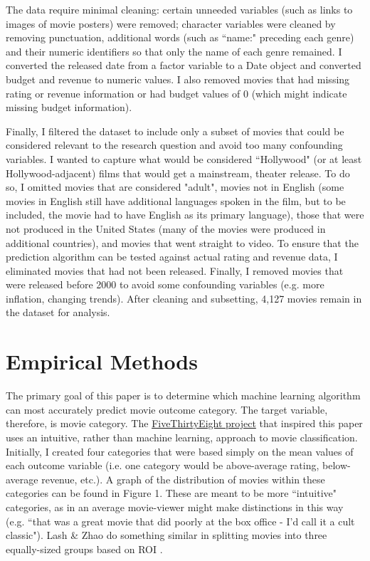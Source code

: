 \documentclass[12pt,english]{article}
\begin{document}
The data require minimal cleaning: certain unneeded variables (such as links to images of movie posters) were removed; character variables were cleaned by removing punctuation, additional words (such as ``name:" preceding each genre) and their numeric identifiers so that only the name of each genre remained. I converted the released date from a factor variable to a Date object and converted budget and revenue to numeric values. I also removed movies that had missing rating or revenue information or had budget values of 0 (which might indicate missing budget information).

Finally, I filtered the dataset to include only a subset of movies that could be considered relevant to the research question and avoid too many confounding variables. I wanted to capture what would be considered ``Hollywood" (or at least Hollywood-adjacent) films that would get a mainstream, theater release. To do so, I omitted movies that are considered "adult", movies not in English (some movies in English still have additional languages spoken in the film, but to be included, the movie had to have English as its primary language), those that were not produced in the United States (many of the movies were produced in additional countries), and movies that went straight to video. To ensure that the prediction algorithm can be tested against actual rating and revenue data, I eliminated movies that had not been released. Finally, I removed movies that were released before 2000 to avoid some confounding variables (e.g. more inflation, changing trends). After cleaning and subsetting, 4,127 movies remain in the dataset for analysis.

\section{Empirical Methods}
The primary goal of this paper is to determine which machine learning algorithm can most accurately predict movie outcome category. The target variable, therefore, is movie category. The \href{https://fivethirtyeight.com/tag/hollywood-taxonomy/}{FiveThirtyEight project} that inspired this paper uses an intuitive, rather than machine learning, approach to movie classification. Initially, I created four categories that were based simply on the mean values of each outcome variable (i.e. one category would be above-average rating, below-average revenue, etc.). A graph of the distribution of movies within these categories can be found in Figure 1. These are meant to be more ``intuitive" categories, as in an average movie-viewer might make distinctions in this way (e.g. ``that was a great movie that did poorly at the box office - I'd call it a cult classic"). Lash \& Zhao do something similar in splitting movies into three equally-sized groups based on ROI \citep{lash}.
\end{document}
